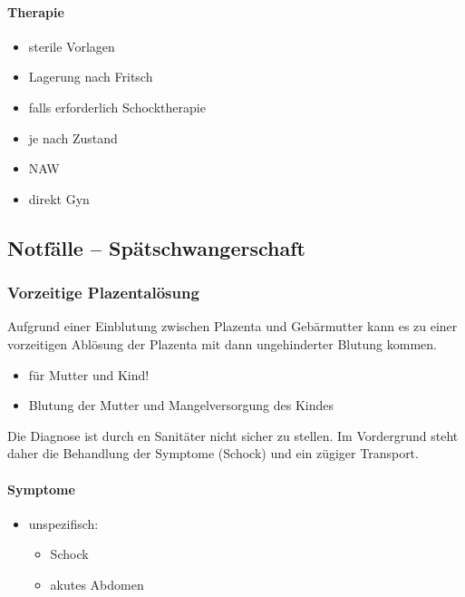 \paragraph{Therapie}

\begin{itemize}
\item sterile Vorlagen
\item Lagerung nach Fritsch
\item falls erforderlich Schocktherapie
\item je nach Zustand
\item NAW
\item direkt Gyn
\end{itemize}


\subsection{Notfälle -- Spätschwangerschaft}

\subsubsection{Vorzeitige Plazentalösung}
{\mdseries
Aufgrund einer Einblutung zwischen Plazenta und Gebärmutter kann es zu
einer vorzeitigen Ablösung der Plazenta mit dann ungehinderter
Blutung kommen.}

\begin{itemize}
\item {\mdseries
{} f\"ur Mutter und Kind! }

\end{itemize}
\begin{itemize}
\item Blutung der Mutter und Mangelversorgung des Kindes 
\end{itemize}

Die Diagnose ist durch en Sanitäter nicht sicher zu stellen. Im
Vordergrund steht daher die Behandlung der Symptome (Schock) und ein
z\"ugiger Transport. 

\paragraph{Symptome}

\begin{itemize}
\item unspezifisch:

\begin{itemize}
\item Schock
\item akutes Abdomen
\end{itemize}
\end{itemize}

